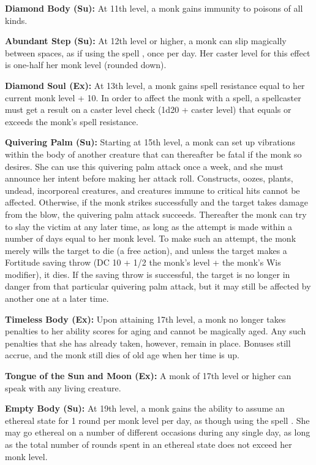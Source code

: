 \textbf{Diamond Body (Su):} At 11th level, a monk gains immunity to poisons of 
all kinds.

\textbf{Abundant Step (Su):} At 12th level or higher, a monk can slip magically 
between spaces, as if using the spell , once per day. Her 
caster level for this effect is one-half her monk level (rounded down).

\textbf{Diamond Soul (Ex):} At 13th level, a monk gains spell resistance equal 
to her current monk level + 10. In order to affect the monk with a spell, a spellcaster 
must get a result on a caster level check (1d20 + caster level) that equals or 
exceeds the monk's spell resistance.

\textbf{Quivering Palm (Su):} Starting at 15th level, a monk can set up vibrations 
within the body of another creature that can thereafter be fatal if the monk so 
desires. She can use this quivering palm attack once a week, and she must announce 
her intent before making her attack roll. Constructs, oozes, plants, undead, incorporeal 
creatures, and creatures immune to critical hits cannot be affected. Otherwise, 
if the monk strikes successfully and the target takes damage from the blow, the 
quivering palm attack succeeds. Thereafter the monk can try to slay the victim 
at any later time, as long as the attempt is made within a number of days equal 
to her monk level. To make such an attempt, the monk merely wills the target to 
die (a free action), and unless the target makes a Fortitude saving throw (DC 10 
+ 1/2 the monk's level + the monk's Wis modifier), it dies. If the saving throw 
is successful, the target is no longer in danger from that particular quivering 
palm attack, but it may still be affected by another one at a later time.

\textbf{Timeless Body (Ex):} Upon attaining 17th level, a monk no longer takes 
penalties to her ability scores for aging and cannot be magically aged. Any such 
penalties that she has already taken, however, remain in place. Bonuses still accrue, 
and the monk still dies of old age when her time is up.

\textbf{Tongue of the Sun and Moon (Ex):} A monk of 17th level or higher can speak 
with any living creature.

\textbf{Empty Body (Su):} At 19th level, a monk gains the ability to assume an 
ethereal state for 1 round per monk level per day, as though using the spell . 
She may go ethereal on a number of different occasions during any single day, as 
long as the total number of rounds spent in an ethereal state does not exceed her 
monk level.

